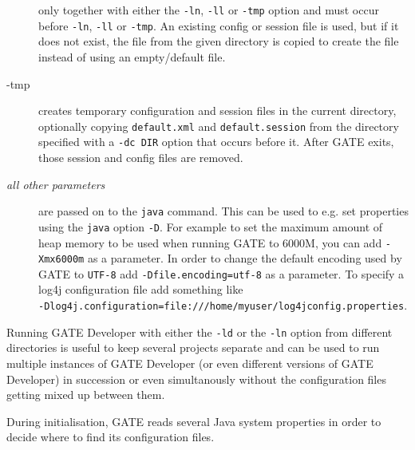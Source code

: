 \begin{description}
    only together with either the \texttt{-ln}, \texttt{-ll} or \texttt{-tmp} option 
    and must occur before \texttt{-ln}, \texttt{-ll} or \texttt{-tmp}. 
    An existing config or session file 
    is used, but if it does not exist, the file from the 
    given directory is copied to create the file instead of using an empty/default file.
  \item[-tmp] creates temporary configuration and session files in the current
    directory, optionally copying \texttt{default.xml} and \texttt{default.session}
    from the directory specified with a \texttt{-dc DIR} option that occurs
    before it. After GATE exits, those session and config files are removed.
  \item[\emph{all other parameters}] are passed on to the \texttt{java} command. 
     This can be used to e.g. set properties using the \texttt{java} option
     \texttt{-D}. For example to set the maximum amount of heap memory to be
     used when running GATE to 6000M, you can add
     \texttt{-Xmx6000m} as a parameter.
     In order to change the default encoding used by GATE to \texttt{UTF-8} add 
     \texttt{-Dfile.encoding=utf-8} as a parameter. To specify 
     a log4j configuration file add something like \\
     \texttt{-Dlog4j.configuration=file:///home/myuser/log4jconfig.properties}.
\end{description}
Running GATE Developer with either the \texttt{-ld} or the \texttt{-ln} 
option from different directories is useful to keep several projects 
separate and can be used to run multiple instances of GATE Developer (or
even different versions of GATE Developer) in succession or even simultanously 
without the configuration files getting mixed up between them.


During initialisation, GATE reads several Java
system properties in order to decide where to find its configuration
files.

